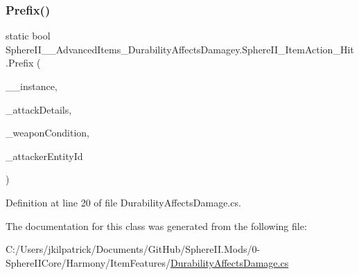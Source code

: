 \subsubsection{\texorpdfstring{Prefix()}{Prefix()}}
{\footnotesize\ttfamily static bool Sphere\+I\+I\+\_\+\+\_\+\+Advanced\+Items\+\_\+\+Durability\+Affects\+Damagey.\+Sphere\+I\+I\+\_\+\+Item\+Action\+\_\+\+Hit.\+Prefix (\begin{DoxyParamCaption}\item[{Item\+Action\+Attack}]{\+\_\+\+\_\+instance,  }\item[{Item\+Action\+Attack.\+Attack\+Hit\+Info}]{\+\_\+attack\+Details,  }\item[{ref float}]{\+\_\+weapon\+Condition,  }\item[{int}]{\+\_\+attacker\+Entity\+Id }\end{DoxyParamCaption})\hspace{0.3cm}{\ttfamily [static]}}



Definition at line 20 of file Durability\+Affects\+Damage.\+cs.



The documentation for this class was generated from the following file\+:\begin{DoxyCompactItemize}
\item 
C\+:/\+Users/jkilpatrick/\+Documents/\+Git\+Hub/\+Sphere\+I\+I.\+Mods/0-\/\+Sphere\+I\+I\+Core/\+Harmony/\+Item\+Features/\mbox{\hyperlink{_durability_affects_damage_8cs}{Durability\+Affects\+Damage.\+cs}}\end{DoxyCompactItemize}
